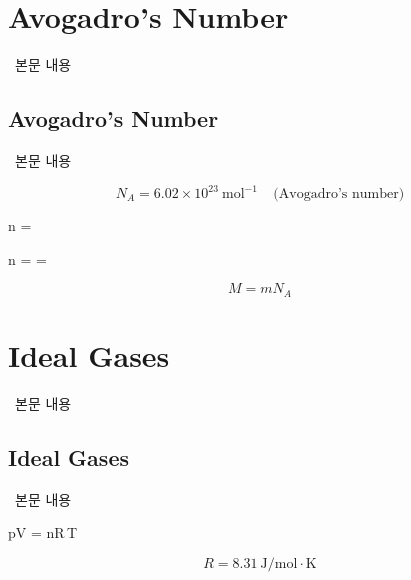 \section{Avogadro's Number}
%
\ 본문 내용

\subsection{Avogadro's Number}
%
\ 본문 내용

\begin{equation} N_A = 6.02 \times 10^{23} \ \text{mol}^{-1} ~~~~~ \text{(Avogadro's number)} \end{equation}

\begin{eqbox} n = 
\label{eq:number_of_moles} \end{eqbox}

\begin{eqbox} n =  = 
\label{eq:relationship_between_number_of_moles_and_mass} \end{eqbox}

\begin{equation} M = m N_A \end{equation}

\section{Ideal Gases}
%
\ 본문 내용

\subsection{Ideal Gases}
%
\ 본문 내용

\begin{eqbox} pV = nR\,T ~~~~~ 
\label{eq:ideal_gas_law} \end{eqbox}

\begin{equation} R = 8.31\ \mathrm{J/mol \cdot K} \end{equation}

